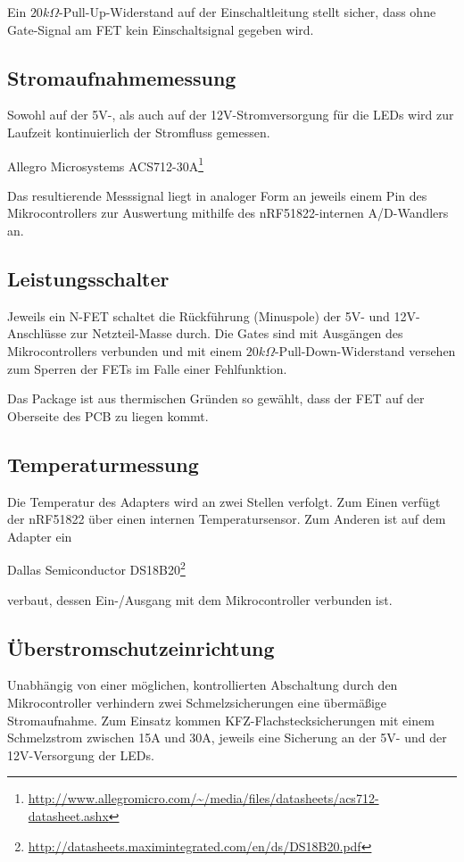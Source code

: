 Ein $20k\Omega$-Pull-Up-Widerstand auf der Einschaltleitung
stellt sicher, dass ohne Gate-Signal am FET
kein Einschaltsignal gegeben wird.

\subsection{Stromaufnahmemessung}
\label{Stromaufnahmemessung}
Sowohl auf der 5V-,
als auch auf der 12V-Stromversorgung
f\"ur die LEDs
wird zur Laufzeit kontinuierlich
der Stromfluss gemessen.

\begin{center}
Allegro Microsystems ACS712-30A\footnote{\url{http://www.allegromicro.com/~/media/files/datasheets/acs712-datasheet.ashx}}
\end{center}
Das resultierende Messsignal liegt
in analoger Form
an jeweils einem Pin des Mikrocontrollers
zur Auswertung
mithilfe des nRF51822-internen A/D-Wandlers
an.

\subsection{Leistungsschalter}
Jeweils ein N-FET schaltet die R\"uckf\"uhrung (Minuspole)
der 5V- und 12V-Anschl\"usse zur Netzteil-Masse durch.
Die Gates sind mit Ausg\"angen des Mikrocontrollers verbunden
und mit einem $20k\Omega$-Pull-Down-Widerstand versehen
zum Sperren der FETs
im Falle einer Fehlfunktion.

Das Package ist
aus thermischen Gr\"unden
so gew\"ahlt,
dass der FET auf der Oberseite des PCB
zu liegen kommt.

\subsection{Temperaturmessung}
Die Temperatur des Adapters wird an zwei Stellen verfolgt.
Zum Einen verf\"ugt der nRF51822 \"uber einen internen Temperatursensor.
Zum Anderen ist auf dem Adapter ein
\begin{center}
	Dallas Semiconductor DS18B20\footnote{\url{http://datasheets.maximintegrated.com/en/ds/DS18B20.pdf}}
\end{center}
verbaut,
dessen Ein-/Ausgang
mit dem Mikrocontroller verbunden ist.

\subsection{\"Uberstromschutzeinrichtung}
Unabh\"angig von einer m\"oglichen, kontrollierten Abschaltung durch den Mikrocontroller
verhindern zwei Schmelzsicherungen eine \"uberm\"a{\ss}ige Stromaufnahme.
Zum Einsatz kommen KFZ-Flachstecksicherungen mit einem Schmelzstrom zwischen 15A und 30A,
jeweils eine Sicherung an der 5V- und der 12V-Versorgung der LEDs.

